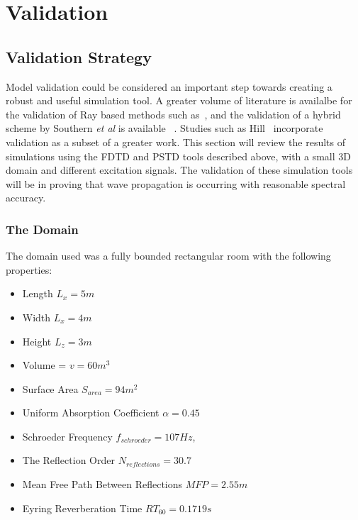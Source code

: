 
\chapter{Validation}
\section{Validation Strategy}
Model validation could be considered an important step towards creating a robust and useful simulation tool. A greater volume of literature is availalbe for the validation of Ray based methods such as~\cite{Ahnert2005,Tsingos2002,Foteinou2010}, and the validation of a hybrid scheme by Southern \textit{et al} is available ~\cite{Southern2013}. Studies such as Hill~\cite{Hill2012} incorporate validation as a subset of a greater work. This section will review the results of simulations using the FDTD and PSTD tools described above, with a small 3D domain and different excitation signals. The validation of these simulation tools will be in proving that wave propagation is occurring with reasonable spectral accuracy.\\

\subsection{The Domain}
The domain used was a fully bounded rectangular room with the following properties:\\

\begin{itemize}
\item Length $L_x = 5m$
\item Width $L_x = 4m$
\item Height $L_z = 3m$
\item Volume = $ v = 60m^3$
\item Surface Area $S_{area} = 94m^2$
\item Uniform Absorption Coefficient $\alpha = 0.45 $
\item Schroeder Frequency  $f_{schroeder} = 107Hz $,
\item The Reflection Order $N_{reflections} = 30.7$
\item Mean Free Path Between Reflections $MFP = 2.55m$
\item Eyring Reverberation Time $RT_{60} = 0.1719s $
\end{itemize}

